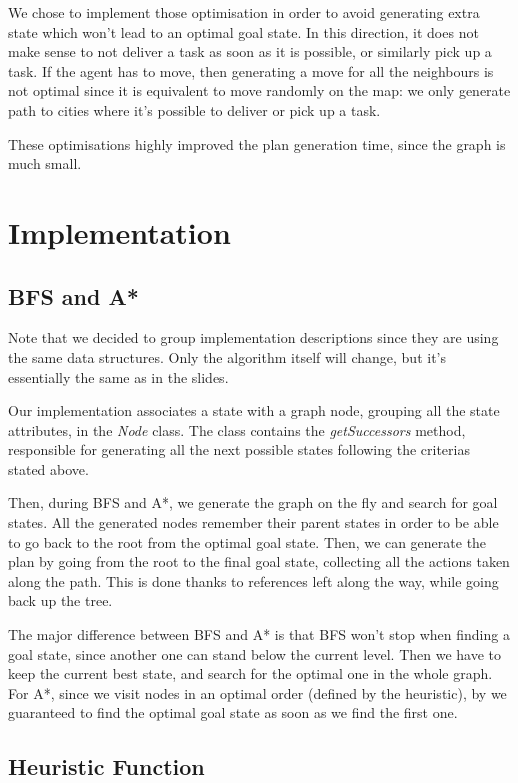 \documentclass[11pt]{article}
\begin{document}
We chose to implement those optimisation in order to avoid generating extra state which won't lead to an optimal goal state. In this direction, it does not make sense to not deliver a task as soon as it is possible, or similarly pick up a task. If the agent has to move, then generating a move for all the neighbours is not optimal since it is equivalent to move randomly on the map: we only generate path to cities where it's possible to deliver or pick up a task.

These optimisations highly improved the plan generation time, since the graph is much small. 

\section{Implementation}

\subsection{BFS and A*}
Note that we decided to group implementation descriptions since they are using the same data structures. Only the algorithm itself will change, but it's essentially the same as in the slides. 

Our implementation associates a state with a graph node, grouping all the state attributes, in the \textit{Node} class. The class contains the \textit{getSuccessors} method, responsible for generating all the next possible states following the criterias stated above. 

Then, during BFS and A*, we generate the graph on the fly and search for goal states. All the generated nodes remember their parent states in order to be able to go back to the root from the optimal goal state. Then, we can generate the plan by going from the root to the final goal state, collecting all the actions taken along the path. This is done thanks to references left along the way, while going back up the tree. 

The major difference between BFS and A* is that BFS won't stop when finding a goal state, since another one can stand below the current level. Then we have to keep the current best state, and search for the optimal one in the whole graph. For A*, since we visit nodes in an optimal order (defined by the heuristic), by we guaranteed to find the optimal goal state as soon as we find the first one. 

\subsection{Heuristic Function}
\end{document}
